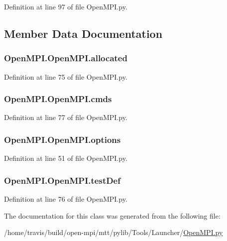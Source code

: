 Definition at line 97 of file Open\-M\-P\-I.\-py.



\subsection{Member Data Documentation}
\hypertarget{class_open_m_p_i_1_1_open_m_p_i_a9ffab4795264fde34d136269026204db}{
\subsubsection[{allocated}]{\setlength{\rightskip}{0pt plus 5cm}Open\-M\-P\-I.\-Open\-M\-P\-I.\-allocated}}\label{class_open_m_p_i_1_1_open_m_p_i_a9ffab4795264fde34d136269026204db}


Definition at line 75 of file Open\-M\-P\-I.\-py.

\hypertarget{class_open_m_p_i_1_1_open_m_p_i_a86be93bbc775c81263813274a8564efc}{
\subsubsection[{cmds}]{\setlength{\rightskip}{0pt plus 5cm}Open\-M\-P\-I.\-Open\-M\-P\-I.\-cmds}}\label{class_open_m_p_i_1_1_open_m_p_i_a86be93bbc775c81263813274a8564efc}


Definition at line 77 of file Open\-M\-P\-I.\-py.

\hypertarget{class_open_m_p_i_1_1_open_m_p_i_a4a263774614f0b83a63a26639b46b2f5}{
\subsubsection[{options}]{\setlength{\rightskip}{0pt plus 5cm}Open\-M\-P\-I.\-Open\-M\-P\-I.\-options}}\label{class_open_m_p_i_1_1_open_m_p_i_a4a263774614f0b83a63a26639b46b2f5}


Definition at line 51 of file Open\-M\-P\-I.\-py.

\hypertarget{class_open_m_p_i_1_1_open_m_p_i_acd20b78013350c2363484589ef85b67c}{
\subsubsection[{test\-Def}]{\setlength{\rightskip}{0pt plus 5cm}Open\-M\-P\-I.\-Open\-M\-P\-I.\-test\-Def}}\label{class_open_m_p_i_1_1_open_m_p_i_acd20b78013350c2363484589ef85b67c}


Definition at line 76 of file Open\-M\-P\-I.\-py.



The documentation for this class was generated from the following file\-:\begin{DoxyCompactItemize}
\item 
/home/travis/build/open-\/mpi/mtt/pylib/\-Tools/\-Launcher/\hyperlink{_open_m_p_i_8py}{Open\-M\-P\-I.\-py}\end{DoxyCompactItemize}
